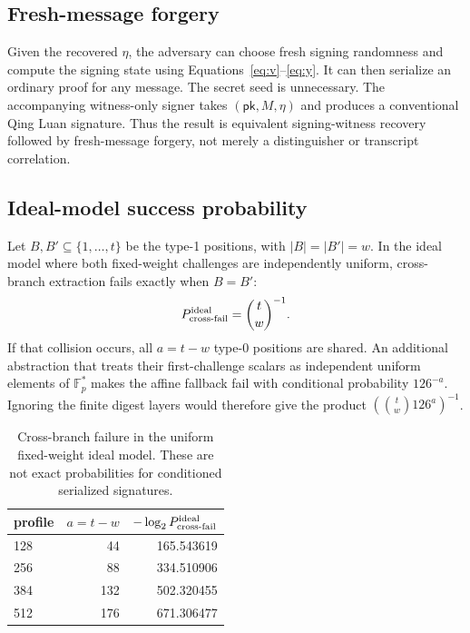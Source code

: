 \documentclass[11pt,a4paper]{article}
\newcommand{\F}{\mathbb F}
\newcommand{\pk}{\ensuremath{\mathsf{pk}}}
\begin{document}
\subsection{Fresh-message forgery}

Given the recovered $\eta$, the adversary can choose fresh signing randomness
and compute the signing state using Equations~\eqref{eq:v}--\eqref{eq:y}.
It can then serialize an ordinary proof for any message.  The secret seed is
unnecessary.  The accompanying
witness-only signer takes $(\pk,M,\eta)$ and produces a conventional Qing Luan
signature.  Thus the result is equivalent signing-witness recovery followed by
fresh-message forgery, not merely a distinguisher or transcript correlation.

\subsection{Ideal-model success probability}

Let $B,B'\subseteq\{1,\ldots,t\}$ be the type-1 positions, with
$|B|=|B'|=w$.  In the ideal model where both fixed-weight challenges are
independently uniform, cross-branch extraction fails exactly when $B=B'$:
\begin{equation}
       P_{\rm cross\text{-}fail}^{\rm ideal}=\binom{t}{w}^{-1}.
                                                        \label{eq:crossfailure}
\end{equation}
If that collision occurs, all $a=t-w$ type-0 positions are shared.  An
additional abstraction that treats their first-challenge scalars as independent
uniform elements of $\F_p^*$ makes the affine fallback fail with conditional
probability $126^{-a}$.  Ignoring the finite digest layers would therefore give
the product $(\binom{t}{w}126^a)^{-1}$.

\begin{table}[ht]
\centering
\caption{Cross-branch failure in the uniform fixed-weight ideal model.  These
are not exact probabilities for conditioned serialized signatures.}
\label{tab:prob}
\begin{tabular}{lrr}
\toprule
profile & $a=t-w$ & $-\log_2 P_{\rm cross\text{-}fail}^{\rm ideal}$
        \\
\midrule
128 & 44  & 165.543619\\
256 & 88  & 334.510906\\
384 & 132 & 502.320455\\
512 & 176 & 671.306477\\
\bottomrule
\end{tabular}
\end{table}
\end{document}
